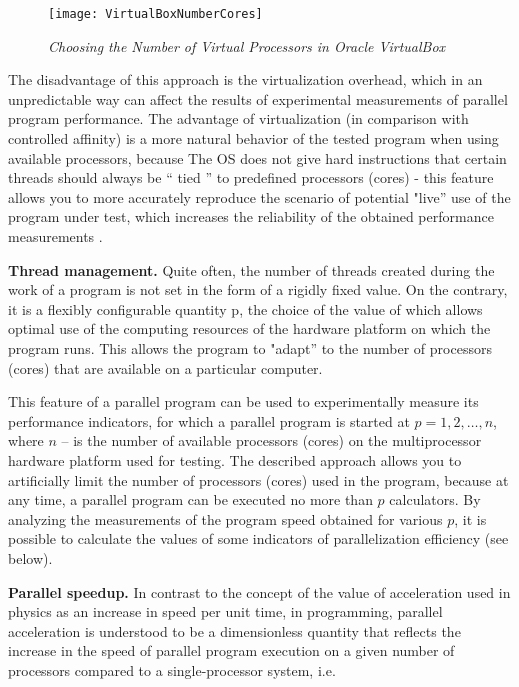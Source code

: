 {	\begin{figure}[H]
		\texttt{[image: VirtualBoxNumberCores]}
		\caption{\textit{Choosing the Number of Virtual Processors in Oracle VirtualBox}}
		\label{VirtualBoxNumberCores:image}
	\end{figure}
	\par The disadvantage of this approach is the virtualization overhead, which in an unpredictable way can affect the results of experimental measurements of parallel program performance. The advantage of virtualization (in comparison with controlled affinity) is a more natural behavior of the tested program when using available processors, because The OS does not give hard instructions that certain threads should always be `` tied '' to predefined processors (cores) - this feature allows you to more accurately reproduce the scenario of potential "live'' use of the program under test, which increases the reliability of the obtained performance measurements .
	\par\textbf{Thread management.} Quite often, the number of threads created during the work of a program is not set in the form of a rigidly fixed value. On the contrary, it is a flexibly configurable quantity p, the choice of the value of which allows optimal use of the computing resources of the hardware platform on which the program runs. This allows the program to "adapt'' to the number of processors (cores) that are available on a particular computer.
	\par This feature of a parallel program can be used to experimentally measure its performance indicators, for which a parallel program is started at $p = 1,2,…,n$, where $n$ –  is the number of available processors (cores) on the multiprocessor hardware platform used for testing. The described approach allows you to artificially limit the number of processors (cores) used in the program, because at any time, a parallel program can be executed no more than $p$ calculators. By analyzing the measurements of the program speed obtained for various $p$, it is possible to calculate the values of some indicators of parallelization efficiency (see below).
	\par\textbf{Parallel speedup.} In contrast to the concept of the value of acceleration used in physics as an increase in speed per unit time, in programming, parallel acceleration is understood to be a dimensionless quantity that reflects the increase in the speed of parallel program execution on a given number of processors compared to a single-processor system, i.e.
}
